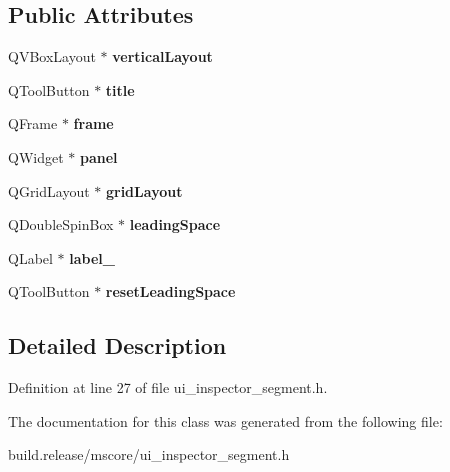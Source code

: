 \subsection*{Public Attributes}
\begin{DoxyCompactItemize}
\item 
\mbox{\label{class_ui___inspector_segment_aea8479772749528de1fcdec0611e0335}} 
Q\+V\+Box\+Layout $\ast$ {\bfseries vertical\+Layout}
\item 
\mbox{\label{class_ui___inspector_segment_a574e33e612d1e78949d0f4baab80f378}} 
Q\+Tool\+Button $\ast$ {\bfseries title}
\item 
\mbox{\label{class_ui___inspector_segment_a0ad155de5340c8456c829313e9bc1d21}} 
Q\+Frame $\ast$ {\bfseries frame}
\item 
\mbox{\label{class_ui___inspector_segment_a935e01c5dfec9a50a12a2d2d67cbc075}} 
Q\+Widget $\ast$ {\bfseries panel}
\item 
\mbox{\label{class_ui___inspector_segment_a97f6379c052b0664e098c1775d236afb}} 
Q\+Grid\+Layout $\ast$ {\bfseries grid\+Layout}
\item 
\mbox{\label{class_ui___inspector_segment_a31d51dbc46c22793134853ee2da52806}} 
Q\+Double\+Spin\+Box $\ast$ {\bfseries leading\+Space}
\item 
\mbox{\label{class_ui___inspector_segment_a84fce10eb5ce6cfc3376953032660da7}} 
Q\+Label $\ast$ {\bfseries label\+\_}
\item 
\mbox{\label{class_ui___inspector_segment_aaa6b075cfc4dbb224210fdcd508e5041}} 
Q\+Tool\+Button $\ast$ {\bfseries reset\+Leading\+Space}
\end{DoxyCompactItemize}


\subsection{Detailed Description}


Definition at line 27 of file ui\+\_\+inspector\+\_\+segment.\+h.



The documentation for this class was generated from the following file\+:\begin{DoxyCompactItemize}
\item 
build.\+release/mscore/ui\+\_\+inspector\+\_\+segment.\+h\end{DoxyCompactItemize}
